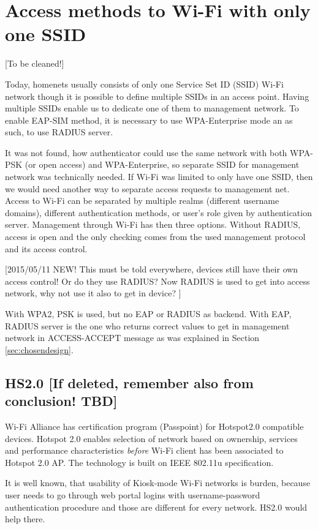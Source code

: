 \documentclass[12pt,a4paper,english]{tutthesis}
\begin{document}
\section{Access methods to Wi-Fi with only one SSID}
\label{sec-4-4}

[To be cleaned!]

Today, homenets usually consists of only one Service Set ID (SSID)
Wi-Fi network though it is possible to define multiple SSIDs in
an access point. Having multiple SSIDs enable us to dedicate one of them
to management network. 
To enable EAP-SIM method, it is necessary to use WPA-Enterprise mode
an as such, to use RADIUS server.

It was not found, how authenticator could use the same network with
both WPA-PSK (or open access) and WPA-Enterprise, so
separate SSID for management network was technically needed.
If Wi-Fi was limited to only have one SSID, then we would need another
way to separate access requests to management net.  Access to Wi-Fi
can be separated by multiple realms (different username domains),
different authentication methods, or user's role
given by authentication server. Management through Wi-Fi has then three
options.  Without RADIUS, access is open and the only checking comes
from the used management protocol and its access control.

[2015/05/11 NEW! This must be told everywhere, devices still have their own access
control! Or do they use RADIUS? Now RADIUS is used to get into access
network, why not use it also to get in device? ]

With WPA2, PSK is used, but no EAP or RADIUS as backend.  With EAP,
RADIUS server is the one who returns correct values to get in
management network in ACCESS-ACCEPT message as was
explained in Section \ref{sec:chosendesign}.


\subsection{HS2.0 [If deleted, remember also from conclusion! TBD]}
\label{sec-4-4-1}

Wi-Fi Alliance has certification program (Passpoint) for Hotspot2.0 compatible
devices.  Hotspot 2.0 enables selection of network based on ownership,
services and performance characteristics \emph{before} Wi-Fi client has
been associated to Hotspot 2.0 AP. The technology is built on
IEEE 802.11u specification.




It is well known, that usability of Kiosk-mode Wi-Fi
 networks is burden, because user needs to go through 
web portal logins with username-password authentication 
procedure and those are different for every network.
HS2.0 would help there.
\end{document}

